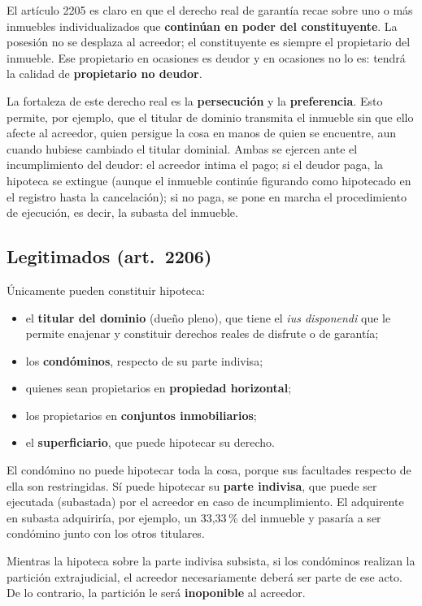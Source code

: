 \documentclass[12pt,oneside]{book}
\begin{document}
El artículo 2205 es claro en que el derecho real de garantía recae sobre uno o más inmuebles individualizados que \textbf{continúan en poder del constituyente}. La posesión no se desplaza al acreedor; el constituyente es siempre el propietario del inmueble. Ese propietario en ocasiones es deudor y en ocasiones no lo es: tendrá la calidad de \textbf{propietario no deudor}.

La fortaleza de este derecho real es la \textbf{persecución} y la \textbf{preferencia}. Esto permite, por ejemplo, que el titular de dominio transmita el inmueble sin que ello afecte al acreedor, quien persigue la cosa en manos de quien se encuentre, aun cuando hubiese cambiado el titular dominial. Ambas se ejercen ante el incumplimiento del deudor: el acreedor intima el pago; si el deudor paga, la hipoteca se extingue (aunque el inmueble continúe figurando como hipotecado en el registro hasta la cancelación); si no paga, se pone en marcha el procedimiento de ejecución, es decir, la subasta del inmueble.

\subsection{Legitimados (art.~2206)}

Únicamente pueden constituir hipoteca:
\begin{itemize}
    \item el \textbf{titular del dominio} (dueño pleno), que tiene el \textit{ius disponendi} que le permite enajenar y constituir derechos reales de disfrute o de garantía;
    \item los \textbf{condóminos}, respecto de su parte indivisa;
    \item quienes sean propietarios en \textbf{propiedad horizontal};
    \item los propietarios en \textbf{conjuntos inmobiliarios};
    \item el \textbf{superficiario}, que puede hipotecar su derecho.
\end{itemize}

El condómino no puede hipotecar toda la cosa, porque sus facultades respecto de ella son restringidas. Sí puede hipotecar su \textbf{parte indivisa}, que puede ser ejecutada (subastada) por el acreedor en caso de incumplimiento. El adquirente en subasta adquiriría, por ejemplo, un 33,33\,\% del inmueble y pasaría a ser condómino junto con los otros titulares.

\begin{important}
Mientras la hipoteca sobre la parte indivisa subsista, si los condóminos realizan la partición extrajudicial, el acreedor necesariamente deberá ser parte de ese acto. De lo contrario, la partición le será \textbf{inoponible} al acreedor.
\end{important}
\end{document}
